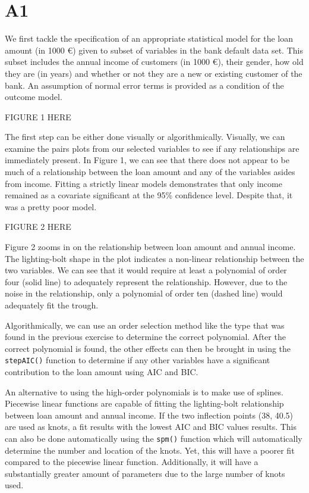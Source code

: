 
\section{A1} 

We first tackle the specification of an appropriate statistical model for the loan amount (in 1000 €) given to subset of variables in the bank default data set. This subset includes the annual income of customers (in 1000 €), their gender, how old they are (in years) and whether or not they are a new or existing customer of the bank. An assumption of normal error terms is provided as a condition of the outcome model. 

FIGURE 1 HERE

The first step can be either done visually or algorithmically. Visually, we can examine the pairs plots from our selected variables to see if any relationships are immediately present. In Figure 1, we can see that there does not appear to be much of a relationship between the loan amount and any of the variables asides from income. Fitting a strictly linear models demonstrates that only income remained as a covariate significant at the 95\% confidence level. Despite that, it was a pretty poor model.

FIGURE 2 HERE

Figure 2 zooms in on the relationship between loan amount and annual income. The lighting-bolt shape in the plot indicates a non-linear relationship between the two variables. We can see that it would require at least a polynomial of order four (solid line) to adequately represent the relationship. However, due to the  noise in the relationship, only a polynomial of order ten (dashed line) would adequately fit the trough. 

Algorithmically, we can use an order selection method like the type that was found in the previous exercise to determine the correct polynomial. After the correct polynomial is found, the other effects can then be brought in using the \lstinline{stepAIC()} function to determine if any other variables have a significant contribution to the loan amount using AIC and BIC. 

An alternative to using the high-order polynomials is to make use of splines. Piecewise linear functions are capable of fitting the lighting-bolt relationship between loan amount and annual income. If the two inflection points (38, 40.5) are used as knots, a fit results with the lowest AIC and BIC values results. This can also be done automatically using the \lstinline{spm()} function which will automatically determine the number and location of the knots. Yet, this will have a poorer fit compared to the piecewise linear function. Additionally, it will have a substantially greater amount of parameters due to the large number of knots used. 


